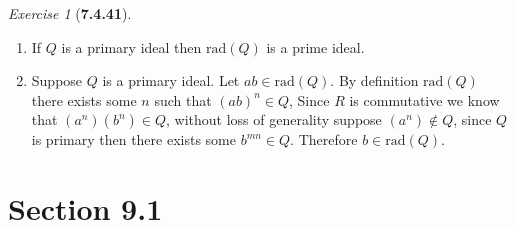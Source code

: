 \documentclass[12pt]{amsart}
\makeatletter
\theoremstyle{remark}
\newtheorem*{exercise}{Exercise}%
\renewenvironment{proof}[1][\proofname]{\par\doublespacing
  \pushQED{\qed}%
  \normalfont \topsep6\p@\@plus6\p@\relax
  \list{}{%
    \settowidth{\leftmargin}{\itshape\proofname:\hskip\labelsep}%
    \setlength{\labelwidth}{0pt}%
    \setlength{\itemindent}{-\leftmargin}%
  }%
  \item[\hskip\labelsep\itshape#1\@addpunct{:}]\ignorespaces
}{%
  \popQED\endlist\@endpefalse
  \singlespacing
}
\theoremstyle{mycomment}
\makeatother
\begin{document}
\begin{exercise}[\textbf{7.4.41}]
\begin{enumerate}
\item[(d)] If $Q$ is a primary ideal then $\text{rad}(Q)$ is a prime ideal. 
\begin{proof} Suppose $Q$ is a primary ideal. Let $ab \in \text{rad}(Q)$. By definition $\text{rad}(Q)$ there exists some $n$ such that $(ab)^n \in Q$, 
  Since $R$ is commutative we know that $(a^n)(b^n) \in Q$, without loss of generality suppose $(a^n) \not\in Q$, since $Q$ is primary then there exists some 
  $b^{mn} \in Q$. Therefore $b \in \text{rad}(Q)$.
\end{proof}


  \end{enumerate}
\end{exercise}
\vspace{.5in}

\section*{\textbf{Section 9.1}}
\end{document}
